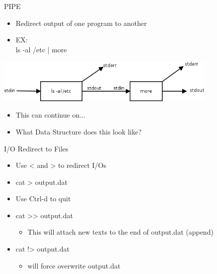 \documentclass{beamer}
\begin{document}
\begin{frame}{PIPE}
\begin{itemize}
\item Redirect output of one program to another
\item EX: \\
ls -al /etc | more
\end{itemize}
\includegraphics[width=0.8\textwidth]{../imgs/pipe-more.png} \\
\begin{itemize}
\item This can continue on...
\item What Data Structure does this look like?
\end{itemize}
\end{frame}

\begin{frame}{I/O Redirect to Files}
\begin{itemize}
\item Use < and > to redirect I/Os
\item cat > output.dat
\item Use Ctrl-d to quit
\item cat >> output.dat
\begin{itemize}
\item This will attach new texts to the end of output.dat (append)
\end{itemize}
\item cat !> output.dat
\begin{itemize}
\item will force overwrite output.dat
\end{itemize}
\end{itemize}
\end{frame}
\end{document}
